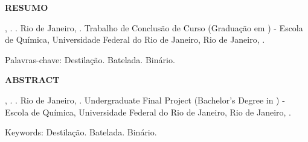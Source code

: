 \newcommand{\keywordOne}{Destilação}
\newcommand{\keywordTwo}{Batelada}
\newcommand{\keywordThree}{Binário}

\begin{center}
    \textbf{RESUMO}
    \vspace{1em}
\end{center}

\noindent {\MakeUppercase \authorLastName}, \authorName. \textbf{\documentTitle}. Rio de Janeiro, \issuanceYear. Trabalho de Conclusão de Curso (Graduação em \degreeCourse) - Escola de Química, Universidade Federal do Rio de Janeiro, Rio de Janeiro, \issuanceYear.
\vspace{1em}

\brazilianAbstract
\vspace{1em}

\noindent Palavras-chave: \keywordOne. \keywordTwo. \keywordThree.

\clearpage

\begin{center}
    \textbf{ABSTRACT}
    \vspace{1em}
\end{center}

\noindent {\MakeUppercase \authorLastName}, \authorName. \textbf{\engDocumentTitle}. Rio de Janeiro, \issuanceYear. Undergraduate Final Project (Bachelor’s Degree in \engDegreeCourse) - Escola de Química, Universidade Federal do Rio de Janeiro, Rio de Janeiro, \issuanceYear.
\vspace{1em}

\englishAbstract
\vspace{1em}

\noindent Keywords: \keywordOne. \keywordTwo. \keywordThree.

\clearpage
